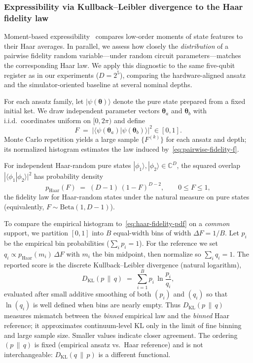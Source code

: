 \documentclass[11pt]{article}
\begin{document}
\subsubsection{Expressibility via Kullback--Leibler divergence to the Haar fidelity law}
Moment-based expressibility~\cite{sim2019} compares low-order moments of state features to their Haar averages. In parallel, we assess how closely the \emph{distribution} of a pairwise fidelity random variable---under random circuit parameters---matches the corresponding Haar law. We apply this diagnostic to the same five-qubit register as in our experiments ($D=2^{5}$), comparing the hardware-aligned ansatz and the simulator-oriented baseline at several nominal depths.

For each ansatz family, let $|\psi(\boldsymbol{\theta})\rangle$ denote the pure state prepared from a fixed initial ket. We draw independent parameter vectors $\boldsymbol{\theta}_{a}$ and $\boldsymbol{\theta}_{b}$ with i.i.d.\ coordinates uniform on $[0,2\pi)$ and define
\begin{equation}
\label{eq:pairwise-fidelity-f}
F \;=\; \bigl|\langle \psi(\boldsymbol{\theta}_{a}) | \psi(\boldsymbol{\theta}_{b}) \rangle \bigr|^{2} \in [0,1].
\end{equation}
Monte Carlo repetition yields a large sample $\{F^{(k)}\}$ for each ansatz and depth; its normalized histogram estimates the law induced by~\eqref{eq:pairwise-fidelity-f}.

For independent Haar-random pure states $|\phi_{1}\rangle,|\phi_{2}\rangle \in \mathbb{C}^{D}$, the squared overlap $|\langle \phi_{1} | \phi_{2} \rangle|^{2}$ has probability density~\cite{zyczkowski2005}
\begin{equation}
\label{eq:haar-fidelity-pdf}
p_{\mathrm{Haar}}(F) \;=\; (D-1)\,(1-F)^{D-2}, \qquad 0 \le F \le 1,
\end{equation}
the fidelity law for Haar-random states under the natural measure on pure states (equivalently, $F \sim \mathrm{Beta}(1,D-1)$).

To compare the empirical histogram to~\eqref{eq:haar-fidelity-pdf} on a \emph{common} support, we partition $[0,1]$ into $B$ equal-width bins of width $\Delta F = 1/B$. Let $p_{i}$ be the empirical bin probabilities ($\sum_{i} p_{i}=1$). For the reference we set $q_{i} \propto p_{\mathrm{Haar}}(m_{i})\,\Delta F$ with $m_{i}$ the bin midpoint, then normalize so $\sum_{i} q_{i}=1$. The reported score is the discrete Kullback--Leibler divergence (natural logarithm),
\begin{equation}
\label{eq:kl-haar-fidelity}
D_{\mathrm{KL}}(p\,\|\,q) \;=\; \sum_{i=1}^{B} p_{i}\,\ln\frac{p_{i}}{q_{i}},
\end{equation}
evaluated after small additive smoothing of both $(p_{i})$ and $(q_{i})$ so that $\ln(q_{i})$ is well defined when bins are nearly empty. Thus $D_{\mathrm{KL}}(p\,\|\,q)$ measures mismatch between the \emph{binned} empirical law and the \emph{binned} Haar reference; it approximates continuum-level KL only in the limit of fine binning and large sample size. Smaller values indicate closer agreement. The ordering $(p\,\|\,q)$ is fixed (empirical ansatz vs.\ Haar reference) and is not interchangeable: $D_{\mathrm{KL}}(q\,\|\,p)$ is a different functional.
\end{document}
